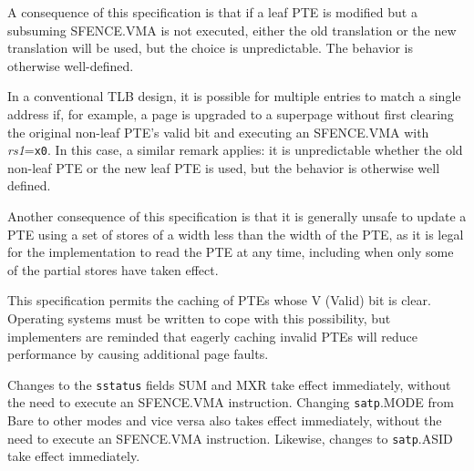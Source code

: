 \begin{commentary}
A consequence of this specification is that if a leaf PTE is modified but a
subsuming SFENCE.VMA is not executed, either the old translation or the new
translation will be used, but the choice is unpredictable.  The behavior is
otherwise well-defined.

In a conventional TLB design, it is possible for multiple entries to match a
single address if, for example, a page is upgraded to a superpage without first
clearing the original non-leaf PTE's valid bit and executing an SFENCE.VMA with
{\em rs1}={\tt x0}.
In this case, a similar remark applies: it is unpredictable whether the old
non-leaf PTE or the new leaf PTE is used, but the behavior is otherwise well
defined.

Another consequence of this specification is that it is generally unsafe to
update a PTE using a set of stores of a width less than the width of the PTE,
as it is legal for the implementation to read the PTE at any time, including
when only some of the partial stores have taken effect.
\end{commentary}

\begin{commentary}
This specification permits the caching of PTEs whose V (Valid) bit is clear.
Operating systems must be written to cope with this possibility, but implementers
are reminded that eagerly caching invalid PTEs will reduce performance by causing
additional page faults.
\end{commentary}

Changes to the {\tt sstatus} fields SUM and MXR take effect immediately,
without the need to execute an SFENCE.VMA instruction.
Changing {\tt satp}.MODE from Bare to other modes and vice versa also
takes effect immediately, without the need to execute an SFENCE.VMA
instruction.
Likewise, changes to {\tt satp}.ASID take effect immediately.

